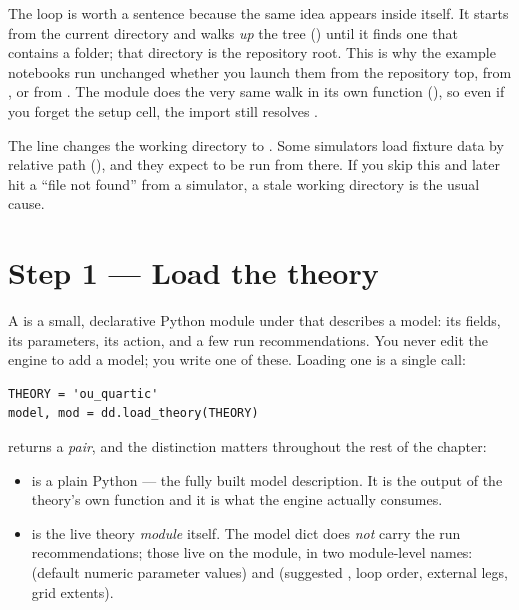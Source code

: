 The  loop is worth a sentence because the same idea appears inside
 itself. It starts from the current directory and walks
\emph{up} the tree () until it finds one
that contains a  folder; that directory is the repository root.
This is why the example notebooks run unchanged whether you launch them from the
repository top, from , or from . The
module does the very same walk in its own  function
(), so even if you forget the setup cell, the
import still resolves .

\begin{gotcha}
The line  changes the working directory to
. Some simulators load fixture data by relative path
(), and they expect to be run from there. If you skip this and
later hit a ``file not found'' from a simulator, a stale working directory is the
usual cause.
\end{gotcha}

\section{Step 1 --- Load the theory}

A  is a small, declarative Python module under
 that describes a model: its fields, its parameters, its action,
and a few run recommendations. You never edit the engine to add a model; you
write one of these. Loading one is a single call:

\begin{lstlisting}
THEORY = 'ou_quartic'
model, mod = dd.load_theory(THEORY)
\end{lstlisting}

 returns a \emph{pair}, and the distinction matters
throughout the rest of the chapter:

\begin{itemize}
  \item {} is a plain Python  --- the fully built model
        description. It is the output of the theory's own 
        function and it is what the engine actually consumes.
  \item {} is the live theory \emph{module} itself. The model dict does
        \emph{not} carry the run recommendations; those live on the module, in
        two module-level names:  (default numeric
        parameter values) and  (suggested , loop order,
        external legs, grid extents).
\end{itemize}

